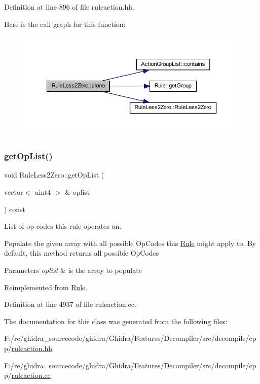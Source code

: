Definition at line 896 of file ruleaction.\+hh.

Here is the call graph for this function\+:
\nopagebreak
\begin{figure}[H]
\begin{center}
\leavevmode
\includegraphics[width=350pt]{class_rule_less2_zero_a586bf16d8b5f4d60990d3594ad2a0b87_cgraph}
\end{center}
\end{figure}
\mbox{\label{class_rule_less2_zero_a223d890a5acce68c2711cc71279f6d2b}} 
\subsubsection{\texorpdfstring{getOpList()}{getOpList()}}
{\footnotesize\ttfamily void Rule\+Less2\+Zero\+::get\+Op\+List (\begin{DoxyParamCaption}\item[{vector$<$ uint4 $>$ \&}]{oplist }\end{DoxyParamCaption}) const\hspace{0.3cm}{\ttfamily [virtual]}}



List of op codes this rule operates on. 

Populate the given array with all possible Op\+Codes this \mbox{\hyperlink{class_rule}{Rule}} might apply to. By default, this method returns all possible Op\+Codes 
\begin{DoxyParams}{Parameters}
{\em oplist} & is the array to populate \\
\hline
\end{DoxyParams}


Reimplemented from \mbox{\hyperlink{class_rule_a4023bfc7825de0ab866790551856d10e}{Rule}}.



Definition at line 4937 of file ruleaction.\+cc.



The documentation for this class was generated from the following files\+:\begin{DoxyCompactItemize}
\item 
F\+:/re/ghidra\+\_\+sourcecode/ghidra/\+Ghidra/\+Features/\+Decompiler/src/decompile/cpp/\mbox{\hyperlink{ruleaction_8hh}{ruleaction.\+hh}}\item 
F\+:/re/ghidra\+\_\+sourcecode/ghidra/\+Ghidra/\+Features/\+Decompiler/src/decompile/cpp/\mbox{\hyperlink{ruleaction_8cc}{ruleaction.\+cc}}\end{DoxyCompactItemize}
